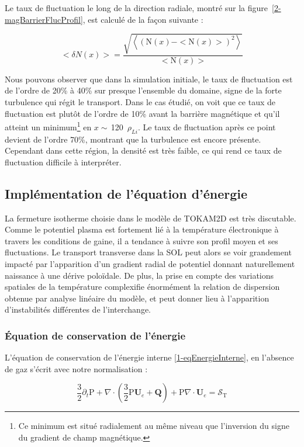 \begin{refsection}
Le taux de fluctuation le long de la direction radiale, montré sur la
figure~\ref{2-magBarrierFlucProfil}, est calculé de la façon suivante :

\begin{equation}
<\delta N(x)>=\frac{\sqrt{\left<(\text{N}(x)-<\text{N}(x)>)^2\right>}}{<\text{N}(x)>}
\end{equation}

Nous pouvons observer que dans la simulation initiale, le taux de fluctuation
est de l'ordre de 20\% à 40\% sur presque l'ensemble du domaine, signe de la forte
turbulence qui régit le transport.
Dans le cas étudié, on voit que ce taux de fluctuation est plutôt de
l'ordre de 10\% avant la barrière magnétique et qu'il atteint un
minimum\footnote{Ce minimum est situé radialement au même niveau que
l'inversion du signe du gradient de champ magnétique.} en
$x\sim\,$120~$\rho_{Li}$. Le taux de fluctuation après ce point devient de
l'ordre 70\%, montrant que la turbulence est encore présente. Cependant dans
 cette région, la densité est très faible, ce qui rend ce taux de
 fluctuation difficile à interpréter.

	\subsection{Implémentation de l'équation d'énergie}
	La fermeture isotherme choisie dans le modèle de TOKAM2D est très
	discutable. Comme le potentiel plasma est fortement lié à la température
	électronique à travers les conditions de gaine, il a tendance à suivre son
	profil moyen et ses fluctuations. Le transport transverse dans la SOL peut
	alors se voir grandement impacté par l'apparition d'un gradient radial de
	potentiel donnant naturellement naissance à une dérive poloïdale. De plus,
	la prise en compte des variations spatiales de la température complexifie énormément la relation de
	dispersion obtenue par analyse linéaire du modèle, et peut donner lieu à
	l'apparition d'instabilités différentes de l'interchange\parencite{Tamain}.
	
	\subsubsection{Équation de conservation de l'énergie}
	
	L'équation de conservation de l'énergie interne
	\ref{1-eqEnergieInterne}, en l'absence de gaz s'écrit avec notre normalisation
	:
	
	\begin{equation} 
	\label{2-eqTempBase}
		\frac{3}{2}\partial_t \text{P} +
		\nabla\cdot\left(\frac{3}{2}\text{P}\mathbf{U}_e+\mathbf{Q}\right) +
		\text{P}\nabla\cdot\mathbf{U}_e=\mathcal{S}_{\text{T}} 
	\end{equation}
	

\end{refsection}
